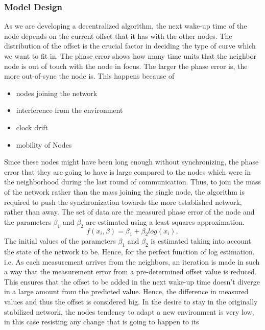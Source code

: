 \documentclass[a4paper,10pt]{report}
\begin{document}
\subsubsection{Model Design}
As we are developing a decentralized algorithm, the next wake-up time of the node depends on the current offset that it has with the other nodes. The distribution of the offset is the crucial factor in deciding the type of curve which we want to fit in. The phase error shows how many time units that the neighbor node is out of touch with the node in focus. The larger the phase error is, the more out-of-sync the node is. This happens because of
\begin{itemize}
\item nodes joining the network
\item interference from the environment
\item clock drift
\item mobility of Nodes
\end{itemize}
Since these nodes might have been long enough without synchronizing, the phase error that they are going to have is large compared to the
nodes which were in the neighborhood during the last round of communication. Thus, to join the mass of the network rather than the
mass joining the single node, the algorithm is required to push the synchronization towards the more established network, rather than
away.\newline
The set of data are the measured phase error of the node and the parameters $\beta_1$ and $\beta_2$ are estimated using a least
squares approximation.
\begin{equation}
 f(x_i,\beta)= \beta _1 + \beta_2log(x_i),
\end{equation}
The initial values of the parameters $\beta_1$ and $\beta_2$ is estimated taking into account the state of the network to be. Hence, for the perfect function of log estimation.
i.e. \newline \newline
As each measurement arrives from the neighbors, an iteration is made in such a way that the measurement error from a pre-determined offset value is reduced. This ensures that the offset to be added in the next wake-up time doesn't diverge in a large amount from the predicted value. Hence, the difference in measured values and thus the offset is considered big. In the desire to stay in the originally stabilized
network, the nodes tendency to adapt a new environment is very low, in this case resisting any change that is going to happen to its
\end{document}
